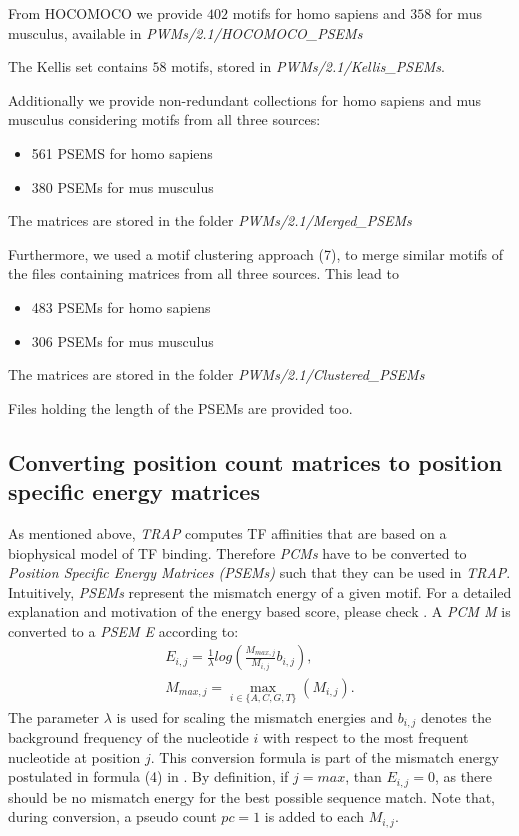 \documentclass{article}
\begin{document}
From HOCOMOCO we provide $402$ motifs for homo sapiens and $358$ for mus musculus, available in \textit{PWMs/2.1/HOCOMOCO\_PSEMs}

The Kellis set contains $58$ motifs, stored in \textit{PWMs/2.1/Kellis\_PSEMs}.

Additionally we provide non-redundant collections for homo sapiens and mus musculus considering motifs from all three sources:
\begin{itemize}
\item 561 PSEMS for homo sapiens
\item 380 PSEMs for mus musculus
\end{itemize}

The matrices are stored in the folder \textit{PWMs/2.1/Merged\_PSEMs}

Furthermore, we used a motif clustering approach (7), to merge similar motifs of the files containing matrices from all three sources. This lead to
\begin{itemize}
\item 483 PSEMs for homo sapiens
\item 306 PSEMs for mus musculus
\end{itemize}
The matrices are stored in the folder \textit{PWMs/2.1/Clustered\_PSEMs}

Files holding the length of the PSEMs are provided too.


\subsection{Converting position count matrices to position specific energy matrices}
As mentioned above, \textit{TRAP} computes TF affinities that are based on a biophysical model of TF binding.
Therefore \textit{PCMs} have to be converted to \textit{Position Specific Energy Matrices (PSEMs)} such that they can be used in \textit{TRAP}.
Intuitively, \textit{PSEMs} represent the mismatch energy of a given motif. For a detailed explanation and motivation of the energy based score, please check \cite{pmid17098775}.
A \textit{PCM M} is converted to a \textit{PSEM E} according to:
\begin{align}
E_{i,j}=\frac{1}{\lambda}log(\frac{M_{max,j}}{M_{i,j}}b_{i,j}), \\
M_{max,j}=\max\limits_{i\in\{A,C,G,T\}}(M_{i,j}).
\end{align}
The parameter $\lambda$ is used for scaling the mismatch energies and $b_{i,j}$ denotes the background frequency of the nucleotide $i$ with respect to the most frequent nucleotide at position $j$. 
This conversion formula is part of the mismatch energy postulated in formula (4) in \cite{pmid17098775}. 
By definition, if $j=max$, than $E_{i,j}=0$, as there should be no mismatch energy for the best possible sequence match. 
Note that, during conversion, a pseudo count $pc = 1$ is added to each $M_{i,j}$. 
\end{document}
